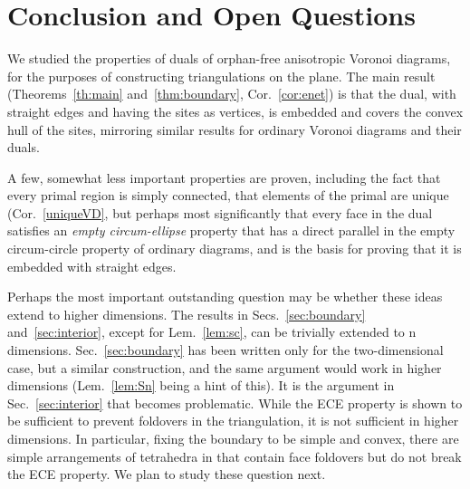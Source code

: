 \documentclass[11pt]{article}
\begin{document}
\section{Conclusion and Open Questions}

We studied the properties of duals of orphan-free anisotropic Voronoi diagrams, for the
purposes of constructing triangulations on the plane. 
The main result (Theorems~\ref{th:main} and~\ref{thm:boundary}, Cor.~\ref{cor:enet}) is that
the dual, with straight edges and having the sites as vertices, is embedded
and covers the convex hull of the sites, mirroring similar results for
ordinary Voronoi diagrams and their duals. 

A few, somewhat less important  properties are proven, including the fact
that every primal region is simply connected, that elements of the primal are unique (Cor.~\ref{uniqueVD}, 
but perhaps most significantly
that every face in the dual satisfies an \emph{empty circum-ellipse}
property that has a direct parallel in the empty circum-circle property of
ordinary diagrams, and is the basis for proving that it is embedded with
straight edges. 

Perhaps the most important outstanding question may be whether these ideas
extend to higher dimensions. The results in Secs.~\ref{sec:boundary} and~\ref{sec:interior},
except for Lem.~\ref{lem:sc}, can be trivially extended to n dimensions. 
Sec.~\ref{sec:boundary} has been written only for the two-dimensional case,
but a similar construction, and the same argument would work in higher
dimensions (Lem.~\ref{lem:Sn} being a hint of this). 
It is the argument in Sec.~\ref{sec:interior} that becomes problematic. 
While the ECE property is shown to be sufficient to prevent foldovers in the
triangulation, it is not sufficient in 
higher dimensions. In particular, fixing the boundary to be simple and convex, 
there are simple arrangements of tetrahedra in  that contain 
face foldovers but do not break the ECE property. 
We plan to study these question next. 













\newpage


\end{document}
